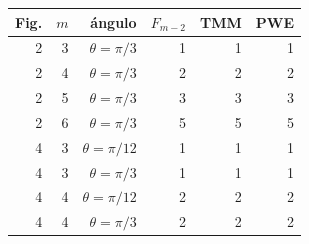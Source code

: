\begin{tabular}{rrrrrr}
\toprule
Fig. & $m$ & ángulo & $F_{m-2}$ & TMM & PWE \\
\midrule
2 & 3 & $\theta=\pi/3$ & 1 & 1 & 1 \\
2 & 4 & $\theta=\pi/3$ & 2 & 2 & 2 \\
2 & 5 & $\theta=\pi/3$ & 3 & 3 & 3 \\
2 & 6 & $\theta=\pi/3$ & 5 & 5 & 5 \\
4 & 3 & $\theta=\pi/12$ & 1 & 1 & 1 \\
4 & 3 & $\theta=\pi/3$ & 1 & 1 & 1 \\
4 & 4 & $\theta=\pi/12$ & 2 & 2 & 2 \\
4 & 4 & $\theta=\pi/3$ & 2 & 2 & 2 \\
\bottomrule
\end{tabular}

